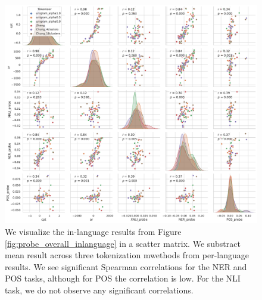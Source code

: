 \begin{figure}
    \centering
    \includegraphics[width=\textwidth]{figures/probe_detailed_inlanguage_scattermatrix.pdf}
    \caption{We visualize the in-language results from Figure \ref{fig:probe_overall_inlanguage} in a scatter matrix. We substract mean result across three tokenization mwethods from per-language results. We see significant Spearman correlations for the NER and POS tasks, although for POS the correlation is low. For the NLI task, we do not observe any significant correlations.}
    \label{fig:probe_overall_inlanguage_scattermatrix}
\end{figure}

